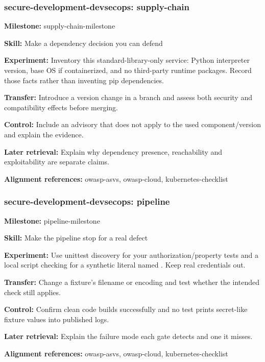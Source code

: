 \subsubsection{secure-development-devsecops: supply-chain}
\noindent\textbf{Milestone:} supply-chain-milestone\par
\noindent\textbf{Skill:} Make a dependency decision you can defend\par
\noindent\textbf{Experiment:} Inventory this standard-library-only service: Python interpreter version, base OS if containerized, and no third-party runtime packages. Record those facts rather than inventing pip dependencies.\par
\noindent\textbf{Transfer:} Introduce a version change in a branch and assess both security and compatibility effects before merging.\par
\noindent\textbf{Control:} Include an advisory that does not apply to the used component/version and explain the evidence.\par
\noindent\textbf{Later retrieval:} Explain why dependency presence, reachability and exploitability are separate claims.\par
\noindent\textbf{Alignment references:} owasp-asvs, owasp-cloud, kubernetes-checklist\par
\subsubsection{secure-development-devsecops: pipeline}
\noindent\textbf{Milestone:} pipeline-milestone\par
\noindent\textbf{Skill:} Make the pipeline stop for a real defect\par
\noindent\textbf{Experiment:} Use unittest discovery for your authorization/property tests and a local script checking for a synthetic literal named . Keep real credentials out.\par
\noindent\textbf{Transfer:} Change a fixture's filename or encoding and test whether the intended check still applies.\par
\noindent\textbf{Control:} Confirm clean code builds successfully and no test prints secret-like fixture values into published logs.\par
\noindent\textbf{Later retrieval:} Explain the failure mode each gate detects and one it misses.\par
\noindent\textbf{Alignment references:} owasp-asvs, owasp-cloud, kubernetes-checklist\par
